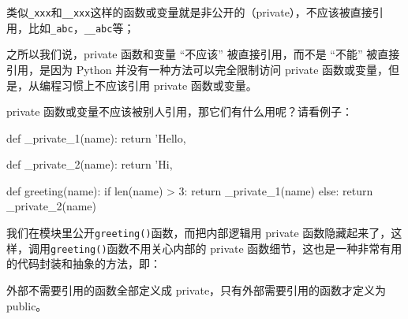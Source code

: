 类似\texttt{\_xxx}和\texttt{\_\_xxx}这样的函数或变量就是非公开的（private），不应该被直接引用，比如\texttt{\_abc}，\texttt{\_\_abc}等；

之所以我们说，private 函数和变量 ``不应该'' 被直接引用，而不是 ``不能''
被直接引用，是因为 Python 并没有一种方法可以完全限制访问 private
函数或变量，但是，从编程习惯上不应该引用 private 函数或变量。

private 函数或变量不应该被别人引用，那它们有什么用呢？请看例子：

\begin{pythoncode}
def _private_1(name):
    return 'Hello, %

def _private_2(name):
    return 'Hi, %

def greeting(name):
    if len(name) > 3:
        return _private_1(name)
    else:
        return _private_2(name)
\end{pythoncode}

我们在模块里公开\texttt{greeting()}函数，而把内部逻辑用 private
函数隐藏起来了，这样，调用\texttt{greeting()}函数不用关心内部的 private
函数细节，这也是一种非常有用的代码封装和抽象的方法，即：

外部不需要引用的函数全部定义成 private，只有外部需要引用的函数才定义为
public。

